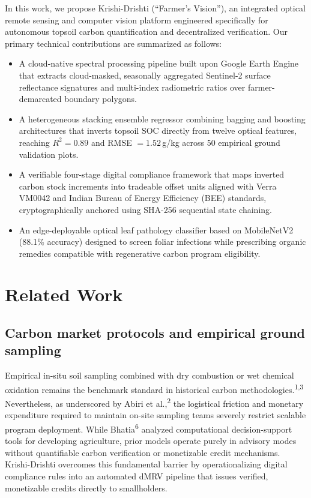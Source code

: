 \documentclass[a4paper,10pt]{article}
\begin{document}
In this work, we propose Krishi-Drishti (``Farmer's Vision''), an integrated optical remote sensing and computer vision platform engineered specifically for autonomous topsoil carbon quantification and decentralized verification. Our primary technical contributions are summarized as follows:
\begin{itemize}[noitemsep,topsep=4pt]
  \item A cloud-native spectral processing pipeline built upon Google Earth Engine that extracts cloud-masked, seasonally aggregated Sentinel-2 surface reflectance signatures and multi-index radiometric ratios over farmer-demarcated boundary polygons.
  \item A heterogeneous stacking ensemble regressor combining bagging and boosting architectures that inverts topsoil SOC directly from twelve optical features, reaching $R^2 = 0.89$ and RMSE $= 1.52\,$g/kg across 50 empirical ground validation plots.
  \item A verifiable four-stage digital compliance framework that maps inverted carbon stock increments into tradeable offset units aligned with Verra VM0042 and Indian Bureau of Energy Efficiency (BEE) standards, cryptographically anchored using SHA-256 sequential state chaining.
  \item An edge-deployable optical leaf pathology classifier based on MobileNetV2 (88.1\% accuracy) designed to screen foliar infections while prescribing organic remedies compatible with regenerative carbon program eligibility.
\end{itemize}

\section{Related Work}

\subsection{Carbon market protocols and empirical ground sampling}
Empirical in-situ soil sampling combined with dry combustion or wet chemical oxidation remains the benchmark standard in historical carbon methodologies.\textsuperscript{1,3} Nevertheless, as underscored by Abiri et al.,\textsuperscript{2} the logistical friction and monetary expenditure required to maintain on-site sampling teams severely restrict scalable program deployment. While Bhatia\textsuperscript{6} analyzed computational decision-support tools for developing agriculture, prior models operate purely in advisory modes without quantifiable carbon verification or monetizable credit mechanisms. Krishi-Drishti overcomes this fundamental barrier by operationalizing digital compliance rules into an automated dMRV pipeline that issues verified, monetizable credits directly to smallholders.
\end{document}
